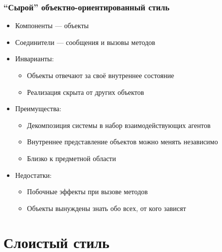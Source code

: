 \documentclass{../../slides-style}
\begin{document}
    \begin{frame}
        \frametitle{``Сырой'' объектно-ориентированный стиль}
        \begin{itemize}
            \item Компоненты --- объекты
            \item Соединители --- сообщения и вызовы методов
            \item Инварианты:
            \begin{itemize}
                \item Объекты отвечают за своё внутреннее состояние
                \item Реализация скрыта от других объектов
            \end{itemize}
            \item Преимущества:
            \begin{itemize}
                \item Декомпозиция системы в набор взаимодействующих агентов
                \item Внутреннее представление объектов можно менять независимо
                \item Близко к предметной области
            \end{itemize}
            \item Недостатки:
            \begin{itemize}
                \item Побочные эффекты при вызове методов
                \item Объекты вынуждены знать обо всех, от кого зависят
            \end{itemize}
        \end{itemize}
    \end{frame}

    \section{Слоистый стиль}
\end{document}
